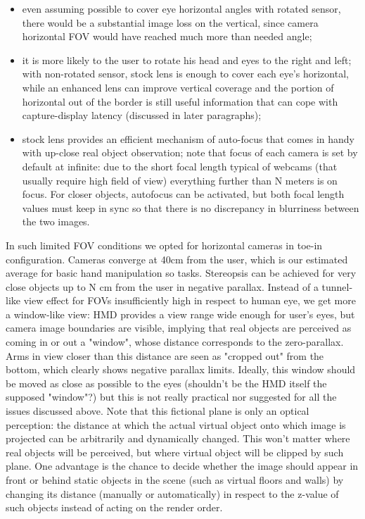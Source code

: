\begin{itemize}
\item even assuming possible to cover eye horizontal angles with rotated sensor, there would be a substantial image loss on the vertical, since camera horizontal FOV would have reached much more than needed angle;
\item it is more likely to the user to rotate his head and eyes to the right and left; with non-rotated sensor, stock lens is enough to cover each eye's horizontal, while an enhanced lens can improve vertical coverage and the portion of horizontal out of the border is still useful information that can cope with capture-display latency (discussed in later paragraphs);
\item stock lens provides an efficient mechanism of auto-focus that comes in handy with up-close real object observation; note that focus of each camera is set by default at infinite: due to the short focal length typical of webcams (that usually require high field of view) everything further than N meters is on focus. For closer objects, autofocus can be activated, but both focal length values must keep in sync so that there is no discrepancy in blurriness between the two images.
\end{itemize}
In such limited FOV conditions we opted for horizontal cameras in toe-in configuration. Cameras converge at 40cm from the user, which is our estimated average for basic hand manipulation so tasks. Stereopsis can be achieved for very close objects up to N cm from the user in negative parallax. Instead of a tunnel-like view effect for FOVs insufficiently high in respect to human eye, we get more a window-like view: HMD provides a view range wide enough for user's eyes, but camera image boundaries are visible, implying that real objects are perceived as coming in or out a "window", whose distance corresponds to the zero-parallax. Arms in view closer than this distance are seen as "cropped out" from the bottom, which clearly shows negative parallax limits. Ideally, this window should be moved as close as possible to the eyes (shouldn't be the HMD itself the supposed "window"?) but this is not really practical nor suggested for all the issues discussed above. Note that this fictional plane is only an optical perception: the distance at which the actual virtual object onto which image is projected can be arbitrarily and dynamically changed. This won't matter where real objects will be perceived, but where virtual object will be clipped by such plane. One advantage is the chance to decide whether the image should appear in front or behind static objects in the scene (such as virtual floors and walls) by changing its distance (manually or automatically) in respect to the z-value of such objects instead of acting on the render order.

